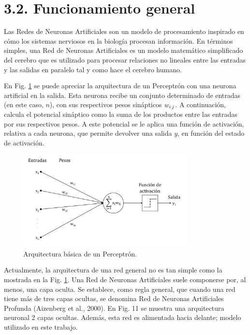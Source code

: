 \documentclass[spanish,a4paper,12pt,twoside]{report}
\begin{document}
    
    \section*{\Large 3.2. Funcionamiento general}
    Las Redes de Neuronas Artificiales son un modelo de procesamiento inspirado en cómo los sistemas nerviosos en la biología procesan información. En términos simples, una Red de Neuronas Artificiales es un modelo matemático simplificado del cerebro que es utilizado para procesar relaciones no lineales entre las entradas y las salidas en paralelo tal y como hace el cerebro humano. \par
    En Fig. \ref{fig:10} se puede apreciar la arquitectura de un Perceptrón con una neurona artificial en la salida. Esta neurona recibe un conjunto determinado de entradas (en este caso, $n$), con sus respectivos pesos sinápticos $w_{i\thinspace j}$. A continuación, calcula el potencial sináptico como la suma de los productos entre las entradas por sus respectivos pesos. A este potencial se le aplica una función de activación, relativa a cada neurona, que permite devolver una salida $y$, en función del estado de activación. \par
    \begin{figure}[H]
      \centering
      \includegraphics[width = 0.8\textwidth]{resources/Fig10.pdf}
      \caption{Arquitectura básica de un Perceptrón.}
      \label{fig:10}
    \end{figure} \par
    Actualmente, la arquitectura de una red general no es tan simple como la mostrada en la Fig. \ref{fig:10}. Una Red de Neuronas Artificiales suele componerse por, al menos, una capa oculta. Se establece, como regla general, que cuando una red tiene más de tres capas ocultas, se denomina Red de Neuronas Artificiales Profunda (Aizenberg et al., 2000). En Fig. 11 se muestra una arquitectura neuronal 2 capas ocultas. Además, esta red es alimentada hacia delante; modelo utilizado en este trabajo. \par
\end{document}
